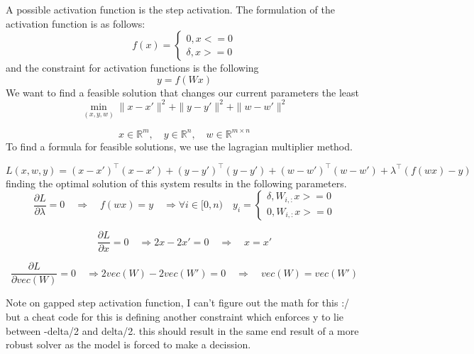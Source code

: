 A possible activation function is the step activation.
The formulation of the activation function is as follows:
        \begin{equation}
            f\left(x\right)=
            \begin{cases}
            0, x<=0\\
            \delta, x>=0
            \end{cases}
        \end{equation}
        and the constraint for activation functions is the following
        \begin{equation}
            y=f\left(Wx\right)
        \end{equation}
We want to find a feasible solution that changes our current parameters the least
\[
\min_{\left(x, y, w\right)} \|x - x'\|^2 + \|y - y'\|^2 + \|w - w'\|^2
\]

\[
x \in \mathbb{R}^m, \quad y \in \mathbb{R}^n, \quad w \in \mathbb{R}^{m\times n}
\]
To find a formula for feasible solutions, we use the lagragian multiplier method.

\[
L\left(x,w,y\right) = \left(x-x'\right)^\top\left(x-x'\right) + \left(y-y'\right)^\top\left(y-y'\right) + \left(w-w'\right)^\top\left(w-w'\right) + \lambda^\top\left(f\left(wx\right)-y\right)
\]
finding the optimal solution of this  system results in the following parameters.
\[
\frac{\partial L}{\partial \lambda} = 0 \quad \Rightarrow \quad f\left(wx\right) = y \quad \Rightarrow \forall i\in [0,n) \quad y_i = \begin{cases}
            \delta, W_{i,:}x>=0\\
            0, W_{i,:}x>=0
            \end{cases}
\]

\[
\frac{\partial L}{\partial x} =0 \quad \Rightarrow
2x - 2x'  = 0 \quad \Rightarrow \quad x = x'
\]

\[
\frac{\partial L}{\partial vec\left(W\right)} =0 \quad \Rightarrow
2vec\left(W\right) - 2vec\left(W'\right)  = 0 \quad \Rightarrow \quad vec\left(W\right) = vec\left(W'\right)
\]


Note on gapped step activation function, I can't figure out the math for this :/ but a cheat code for this is defining another constraint which enforces y to lie between -delta/2 and delta/2. this should result in the same end result of a more robust solver as the model is forced to make a decission.